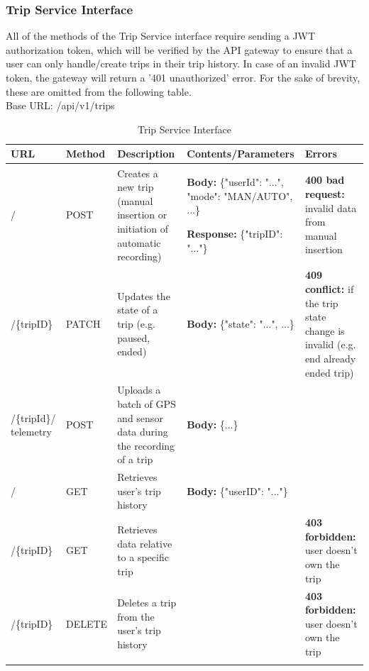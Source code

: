 \subsubsection{Trip Service Interface}
All of the methods of the Trip Service interface require sending a JWT authorization token,
which will be verified by the API gateway to ensure that a user can only handle/create trips in their
trip history. In case of an invalid JWT token, the gateway will return a '401 unauthorized' error. 
For the sake of brevity, these are omitted from the following table.\\
\newline
Base URL: /api/v1/trips
\begin{longtable}{|p{1.5cm}|p{1.3cm}|p{4cm}|p{4cm}|p{3.5cm}|}
   \hline
   \textbf{URL} & \textbf{Method} & \textbf{Description} & \textbf{Contents/Parameters} & \textbf{Errors} \\ \hline
   \endhead
   / & POST & Creates a new trip (manual insertion or initiation of automatic recording) & \textbf{Body:} \{"userId": "...", "mode": "MAN/AUTO", ...\} 
   
   \textbf{Response:} \{"tripID": "..."\} & \textbf{400 bad request:} invalid data from manual insertion\\
   \hline
   /\{tripID\} & PATCH & Updates the state of a trip (e.g. paused, ended) & \textbf{Body:} \{"state": "...", ...\} & \textbf{409 conflict:} if the trip state change is invalid (e.g. end already ended trip)\\
   \hline
   /\{tripId\}/ telemetry & POST & Uploads a batch of GPS and sensor data during the recording of a trip & \textbf{Body:} \{...\} & \\
   \hline
   / & GET & Retrieves user's trip history & \textbf{Body:} \{"userID": "..."\} & \\
   \hline
   /\{tripID\} & GET & Retrieves data relative to a specific trip & & \textbf{403 forbidden:} user doesn't own the trip\\
   \hline
   /\{tripID\} & DELETE & Deletes a trip from the user's trip history & & \textbf{403 forbidden:} user doesn't own the trip \\
   \hline
   \caption[]{Trip Service Interface}
\end{longtable}

